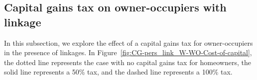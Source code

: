 \subsection{Capital gains tax on owner-occupiers  with linkage}
In this subsection, we explore the effect of a capital gains tax for owner-occupiers in the presence of linkages. 
In Figure~\ref{fig:CG-pers_link_W-WO-Cost-of-capital}, the dotted line represents the case with no capital gains tax for homeowners, the solid line represents a 50\% tax, and the dashed line represents a 100\% tax.
\begin{figure}[h!tb]   
    \centering
\end{figure}
